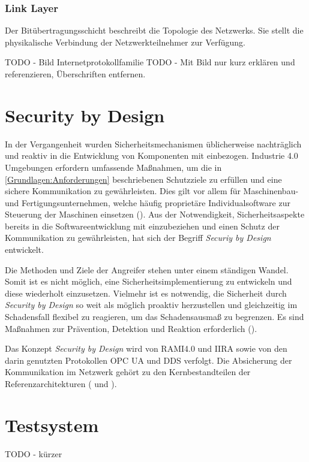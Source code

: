 \subsubsection{Link Layer}
Der Bitübertragungsschicht beschreibt die Topologie des Netzwerks. Sie stellt die physikalische Verbindung der Netzwerkteilnehmer zur Verfügung.

TODO - Bild Internetprotokollfamilie
TODO - Mit Bild nur kurz erklären und referenzieren, Überschriften entfernen.

\section{Security by Design}
\label{Grundlagen:Security by Design}
In der Vergangenheit wurden Sicherheitsmechanismen üblicherweise nachträglich und reaktiv in die Entwicklung von Komponenten mit einbezogen. Industrie 4.0 Umgebungen erfordern umfassende Maßnahmen, um die in \autoref{Grundlagen:Anforderungen} beschriebenen Schutzziele zu erfüllen und eine sichere Kommunikation zu gewährleisten. Dies gilt vor allem für Maschinenbau- und Fertigungsunternehmen, welche häufig proprietäre Individualsoftware zur Steuerung der Maschinen einsetzen (\cite{DTAG2016}). Aus der Notwendigkeit, Sicherheitsaspekte bereits in die Softwareentwicklung mit einzubeziehen und einen Schutz der Kommunikation zu gewährleisten, hat sich der Begriff \textit{Securiy by Design} entwickelt.

Die Methoden und Ziele der Angreifer stehen unter einem ständigen Wandel. Somit ist es nicht möglich, eine Sicherheitsimplementierung zu entwickeln und diese wiederholt einzusetzen. Vielmehr ist es notwendig, die Sicherheit durch \textit{Security by Design} so weit als möglich proaktiv herzustellen und gleichzeitig im Schadensfall flexibel zu reagieren, um das Schadensausmaß zu begrenzen. Es sind Maßnahmen zur Prävention, Detektion und Reaktion erforderlich (\cite{Umsetzung2015}). 

Das Konzept \textit{Security by Design} wird von \ac{RAMI4.0} und \ac{IIRA} sowie von den darin genutzten Protokollen \ac{OPC UA} und \ac{DDS} verfolgt. Die Absicherung der Kommunikation im Netzwerk gehört zu den Kernbestandteilen der Referenzarchitekturen (\cite{iirasec2017} und \cite{opcpt2}).

\section{Testsystem}
\label{Grundlagen:Testsystem}
TODO - kürzer

